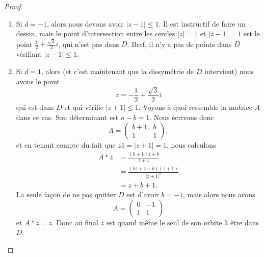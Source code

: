 \begin{proof}
\begin{subproof}
\begin{enumerate}
\begin{enumerate}
				            \begin{enumerate}
					            \item
					                  Si \( d=-1\), alors nous devons avoir \( | z-1 |\leq 1\). Il est instructif de faire un dessin, mais le point d'intersection entre les cercles \( | z |=1\) et \( | z-1 |=1\) est le point \( \frac{ 1 }{2}+\frac{ \sqrt{3} }{2}i\), qui n'est pas dans \( D\). Bref, il n'y a pas de points dans \( D\) vérifiant \( | z-1 |\leq 1\).

					            \item
					                  Si \( d=1\), alors (et c'est maintenant que la dissymétrie de \( D\) intervient) nous avons le point
					                  \begin{equation}
						                  z=-\frac{ 1 }{2}+\frac{ \sqrt{3} }{2}i
					                  \end{equation}
					                  qui est dans \( D\) et qui vérifie \( | z+1 |\leq 1\). Voyons à quoi ressemble la matrice \( A\) dans ce cas. Son déterminant est \( a-b=1\). Nous écrivons donc
					                  \begin{equation}
						                  A=\begin{pmatrix}
							                  b+1 & b \\
							                  1   & 1
						                  \end{pmatrix},
					                  \end{equation}
					                  et en tenant compte du fait que \( z\bar z=| z+1 |=1\), nous calculons
					                  \begin{subequations}
						                  \begin{align}
							                  A*z & =\frac{ (b+1)z+b }{ z+1 }                 \\
							                      & =\frac{ (bz+z+b)(\bar z+1) }{ | z+1 |^2 } \\
							                      & =z+b+1.
						                  \end{align}
					                  \end{subequations}
					                  La seule façon de ne pas quitter \( D\) est d'avoir \( b=-1\), mais alors nous avons
					                  \begin{equation}
						                  A=\begin{pmatrix}
							                  0 & -1 \\
							                  1 & 1
						                  \end{pmatrix}
					                  \end{equation}
					                  et \( A*z=z\). Donc au final \( z\) est quand même le seul de son orbite à être dans \( D\).


\end{enumerate}
\end{enumerate}
\end{enumerate}
\end{subproof}
\end{proof}
